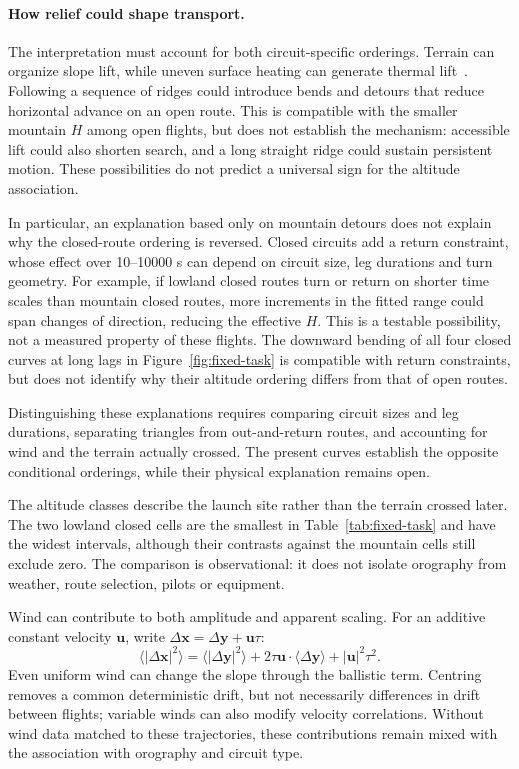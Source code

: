\paragraph{How relief could shape transport.}
The interpretation must account for both circuit-specific orderings.
Terrain can organize slope lift, while uneven surface heating can generate
thermal lift~\cite[Chapter~9]{faa_glider2024}.
Following a sequence of ridges could introduce bends and detours that reduce
horizontal advance on an open route. This is compatible with the smaller
mountain $H$ among open flights, but does not establish the mechanism: accessible
lift could also shorten search, and a long straight ridge could sustain
persistent motion. These possibilities do not predict a universal sign for
the altitude association.

In particular, an explanation based only on mountain detours does not explain
why the closed-route ordering is reversed. Closed circuits add a return
constraint, whose effect over 10--10000 s can depend on circuit size, leg
durations and turn geometry. For example, if lowland closed routes turn or
return on shorter time scales than mountain closed routes, more increments
in the fitted range could span changes of direction, reducing the effective
$H$. This is a testable possibility, not a measured property of these flights.
The downward bending of all four closed curves at long lags in
Figure~\ref{fig:fixed-task} is compatible with return constraints, but does not
identify why their altitude ordering differs from that of open routes.

Distinguishing these explanations requires comparing circuit sizes and leg
durations, separating triangles from out-and-return routes, and accounting
for wind and the terrain actually crossed. The present curves establish the
opposite conditional orderings, while their physical explanation remains open.

The altitude classes describe the launch site rather than the terrain crossed
later. The two lowland closed cells are the smallest in
Table~\ref{tab:fixed-task} and have the widest intervals, although their contrasts
against the mountain cells still exclude zero. The comparison is observational: it
does not isolate orography from weather, route selection, pilots or equipment.

Wind can contribute to both amplitude and apparent scaling. For an additive constant
velocity $\boldsymbol u$, write $\Delta\boldsymbol x=\Delta\boldsymbol y+\boldsymbol u\tau$:
\begin{equation}
 \langle|\Delta\boldsymbol x|^2\rangle
 =\langle|\Delta\boldsymbol y|^2\rangle
 +2\tau\boldsymbol u\cdot\langle\Delta\boldsymbol y\rangle+|\boldsymbol u|^2\tau^2.
 \label{eq:fixed-wind}
\end{equation}
Even uniform wind can change the slope through the ballistic term. Centring removes
a common deterministic drift, but not necessarily differences in drift between
flights; variable winds can also modify velocity correlations. Without wind data
matched to these trajectories, these contributions remain mixed with the
association with orography and circuit type.
\FloatBarrier
